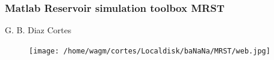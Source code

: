 \documentclass{beamer}
\begin{document}
\begin{frame}\frametitle{Matlab Reservoir simulation toolbox MRST}
		\centering
		{
		
		\begin{minipage}{0.7\textwidth}
		G. B. Diaz Cortes\\
		

		\end{minipage}
		}
		
		\centering
		{
		
		\begin{minipage}{.5\textwidth}
		\begin{figure}
 \centering
\texttt{[image: /home/wagm/cortes/Localdisk/baNaNa/MRST/web.jpg]}
\end{figure}
\end{minipage}%
		\begin{minipage}{0.5\textwidth}
		

		\end{minipage}
		}
\end{frame}
\end{document}
